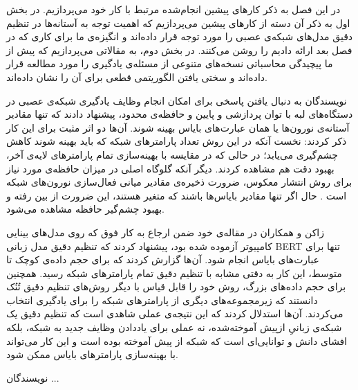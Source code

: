 

در این فصل به ذکر کارهای پیشین انجام‌شده مرتبط با کار خود می‌پردازیم. در بخش اول به ذکر آن دسته از کارهای پیشین می‌پردازیم که اهمیت توجه به آستانه‌ها در تنظیم دقیق مدل‌های شبکه‌ی عصبی را مورد توجه قرار داده‌اند و انگیزه‌ی ما برای کاری که در فصل بعد ارائه دادیم را روشن می‌کنند. در بخش دوم، به مقالاتی می‌پردازیم که پیش از ما پیچیدگی محاسباتی نسخه‌های متنوعی از مسئله‌ی یادگیری را مورد مطالعه قرار داده‌اند و سختی یافتن الگوریتمی قطعی برای آن را نشان داده‌اند.


نویسندگان  به دنبال یافتن پاسخی برای امکان انجام وظایف یادگیری شبکه‌‌ی عصبی در دستگاه‌های لبه با توان پردازشی و پایین و حافظه‌ی محدود، پیشنهاد دادند که تنها مقادیر آستانه‌ی نورون‌ها یا همان عبارت‌های بایاس بهینه شوند. آن‌ها دو اثر مثبت برای این کار ذکر کردند: نخست آنکه در این روش تعداد پارامترهای شبکه که باید بهینه شوند کاهش چشم‌گیری می‌یابد؛ در حالی که در مقایسه با بهینه‌سازی تمام پارامترهای لایه‌ی آخر، بهبود دقت هم مشاهده کردند. دیگر آنکه گلوگاه اصلی در میزان حافظه‌ی مورد نیاز برای روش انتشار معکوس، ضرورت ذخیره‌ی مقادیر میانی فعال‌سازی نورون‌های شبکه است . حال اگر تنها مقادیر بایاس‌ها باشند که متغیر هستند، این ضرورت از بین رفته و بهبود چشم‌گیر حافظه مشاهده می‌شود.


زاکن و همکاران  در مقاله‌ی خود ضمن ارجاع به کار فوق که روی مدل‌های بینایی کامپیوتر آزموده شده بود، پیشنهاد کردند که تنظیم دقیق مدل زبانی BERT تنها برای عبارت‌های بایاس انجام شود. آن‌ها گزارش کردند که برای حجم داده‌ی کوچک تا متوسط، این کار به دقتی مشابه با تنظیم دقیق تمام پارامترهای شبکه رسید. همچنین برای حجم داده‌های بزرگ، روش خود را قابل قیاس با دیگر روش‌های تنظیم دقیق تُنُک دانستند که زیرمجموعه‌های دیگری از پارامترهای شبکه را برای یادگیری انتخاب می‌کردند. آن‌ها استدلال کردند که این نتیجه‌ی عملی شاهدی است که تنظیم دقیق یک شبکه‌ی زبانیِ از‌پیش آموخته‌شده، نه عملی برای یاددادن وظایف جدید به شبکه، بلکه افشای دانش و توانایی‌ای است که شبکه از پیش آموخته بوده است و این کار می‌تواند با بهینه‌سازی پارامترهای بایاس ممکن شود.

نویسندگان  ...


